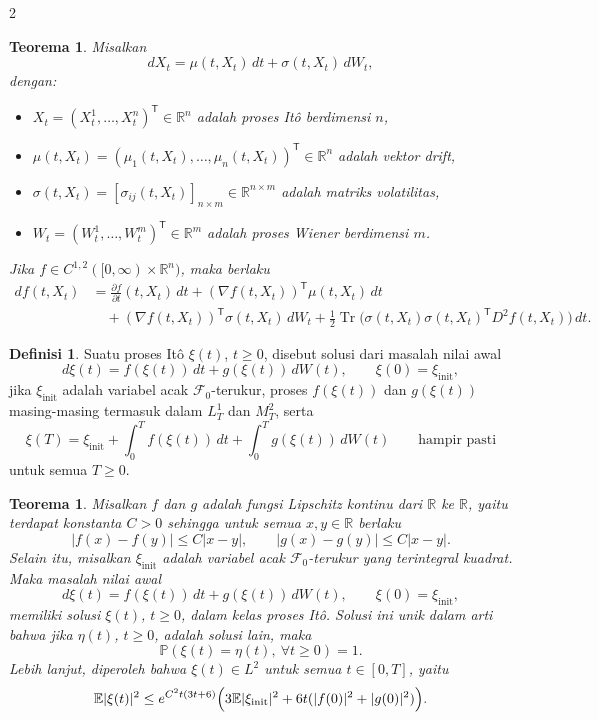 \documentclass[a4paper,extrafontsizes, 9pt]{memoir}
\theoremstyle{definition}
\newtheorem{definisi}[kalstok]{Definisi}
\theoremstyle{plain}
\newtheorem{teorema}[kalstok]{Teorema}
\theoremstyle{remark}
\begin{document}
\begin{multicols}{2}
  \begin{teorema}
    Misalkan
    \[dX_t=\mu(t,X_t)\,dt+\sigma(t,X_t)\,dW_t,\]
    dengan:
    \begin{itemize}[leftmargin=*, itemsep=0.5mm]
      \item $X_t=(X_t^1,\ldots,X_t^n)^{\mathsf T}\in\mathbb{R}^n$ adalah proses It\^o
            berdimensi $n$,
      \item $\mu(t,X_t)=(\mu_1(t,X_t),\ldots,\mu_n(t,X_t))^{\mathsf T}\in\mathbb{R}^n$ adalah
            vektor drift,
      \item $\sigma(t,X_t)=[\sigma_{ij}(t,X_t)]_{n\times m}\in\mathbb{R}^{n\times m}$ adalah
            matriks volatilitas,
      \item $W_t=(W_t^1,\ldots,W_t^m)^{\mathsf T}\in\mathbb{R}^m$ adalah proses Wiener
            berdimensi $m$.
    \end{itemize}
    Jika $f\in C^{1,2}([0,\infty)\times\mathbb{R}^n)$, maka berlaku
    \begin{align*}
      df(t,X_t)
       & =
      \frac{\partial f}{\partial t}(t,X_t)\,dt+(\nabla f(t,X_t))^{\mathsf T}\mu(t,X_t)\,dt \\
       & \quad +
         (\nabla f(t,X_t))^{\mathsf T}\sigma(t,X_t)\,dW_t
      +\frac{1}{2}\operatorname{Tr}\!\bigl(\sigma(t,X_t)\sigma(t,X_t)^{\mathsf T}D^2f(t,X_t)\bigr)\,dt.
    \end{align*}
  \end{teorema}

  \begin{definisi}
    Suatu proses It\^o $\xi(t)$, $t\ge 0$, disebut solusi dari masalah nilai awal
    \[d\xi(t)=f(\xi(t))\,dt+g(\xi(t))\,dW(t),\qquad \xi(0)=\xi_{\mathrm{init}},\]
    jika $\xi_{\mathrm{init}}$ adalah variabel acak $\mathcal{F}_0$-terukur,
    proses $f(\xi(t))$ dan $g(\xi(t))$ masing-masing termasuk dalam $L_T^1$ dan $M_T^2$,
    serta
    \[\xi(T)=\xi_{\mathrm{init}}+\int_0^T f(\xi(t))\,dt+\int_0^T g(\xi(t))\,dW(t)
      \qquad \text{hampir pasti}\]
    untuk semua $T\ge 0$.
  \end{definisi}

  \begin{teorema}
    Misalkan $f$ dan $g$ adalah fungsi Lipschitz kontinu dari $\mathbb{R}$ ke $\mathbb{R}$,
    yaitu terdapat konstanta $C>0$ sehingga untuk semua $x,y\in\mathbb{R}$ berlaku
    \[|f(x)-f(y)|\le C|x-y|,\qquad |g(x)-g(y)|\le C|x-y|.\]
    Selain itu, misalkan $\xi_{\mathrm{init}}$ adalah variabel acak $\mathcal{F}_0$-terukur
    yang terintegral kuadrat. Maka masalah nilai awal
    \[d\xi(t)=f(\xi(t))\,dt+g(\xi(t))\,dW(t),\qquad \xi(0)=\xi_{\mathrm{init}},\]
    memiliki solusi $\xi(t)$, $t\ge 0$, dalam kelas proses It\^o. Solusi ini unik dalam arti
    bahwa jika $\eta(t)$, $t\ge 0$, adalah solusi lain, maka
    \[\mathbb{P}(\xi(t)=\eta(t),\ \forall t\ge 0)=1.\]
    Lebih lanjut, diperoleh bahwa $\xi(t)\in L^2$ untuk semua $t\in[0,T]$, yaitu
    \[\mathbb{E}|\xi(t)|^2\le
      e^{C^2t(3t+6)}\Bigl(3\mathbb{E}|\xi_{\mathrm{init}}|^2+6t(|f(0)|^2+|g(0)|^2)\Bigr).\]
  \end{teorema}


\end{multicols}
\end{document}
